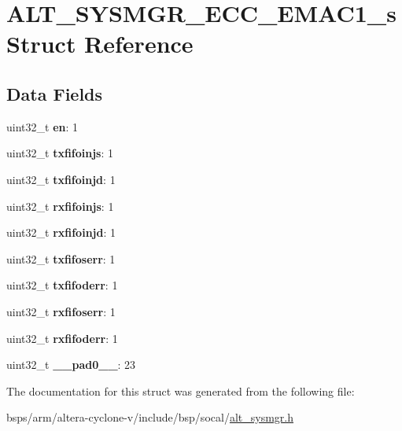 \hypertarget{structALT__SYSMGR__ECC__EMAC1__s}{}\section{A\+L\+T\+\_\+\+S\+Y\+S\+M\+G\+R\+\_\+\+E\+C\+C\+\_\+\+E\+M\+A\+C1\+\_\+s Struct Reference}
\label{structALT__SYSMGR__ECC__EMAC1__s}
\subsection*{Data Fields}
\begin{DoxyCompactItemize}
\item 
\mbox{\label{structALT__SYSMGR__ECC__EMAC1__s_abb16757edc48dcfcb659c0d7fe0a7198}} 
uint32\+\_\+t {\bfseries en}\+: 1
\item 
\mbox{\label{structALT__SYSMGR__ECC__EMAC1__s_aff27bdd3b4405a982e0381f341c94656}} 
uint32\+\_\+t {\bfseries txfifoinjs}\+: 1
\item 
\mbox{\label{structALT__SYSMGR__ECC__EMAC1__s_aa0cfbfd75d7efb9bb9fb0f5c68eaf8f0}} 
uint32\+\_\+t {\bfseries txfifoinjd}\+: 1
\item 
\mbox{\label{structALT__SYSMGR__ECC__EMAC1__s_a2b1dc1608a19f17511173e443e98704d}} 
uint32\+\_\+t {\bfseries rxfifoinjs}\+: 1
\item 
\mbox{\label{structALT__SYSMGR__ECC__EMAC1__s_a8c15df22604f7fe1fb602f68651fe2b9}} 
uint32\+\_\+t {\bfseries rxfifoinjd}\+: 1
\item 
\mbox{\label{structALT__SYSMGR__ECC__EMAC1__s_ab4ba0674dd30c190982ac401610c6339}} 
uint32\+\_\+t {\bfseries txfifoserr}\+: 1
\item 
\mbox{\label{structALT__SYSMGR__ECC__EMAC1__s_aafa85d1798c250c20080a983737d55f0}} 
uint32\+\_\+t {\bfseries txfifoderr}\+: 1
\item 
\mbox{\label{structALT__SYSMGR__ECC__EMAC1__s_a04bf9b0dec5c7836640dbe38274d7ee5}} 
uint32\+\_\+t {\bfseries rxfifoserr}\+: 1
\item 
\mbox{\label{structALT__SYSMGR__ECC__EMAC1__s_aa4c42dccc2ed6a918105c96c5d85a550}} 
uint32\+\_\+t {\bfseries rxfifoderr}\+: 1
\item 
\mbox{\label{structALT__SYSMGR__ECC__EMAC1__s_a37a555b57319c098e112a7c58a65091f}} 
uint32\+\_\+t {\bfseries \+\_\+\+\_\+pad0\+\_\+\+\_\+}\+: 23
\end{DoxyCompactItemize}


The documentation for this struct was generated from the following file\+:\begin{DoxyCompactItemize}
\item 
bsps/arm/altera-\/cyclone-\/v/include/bsp/socal/\mbox{\hyperlink{alt__sysmgr_8h}{alt\+\_\+sysmgr.\+h}}\end{DoxyCompactItemize}

